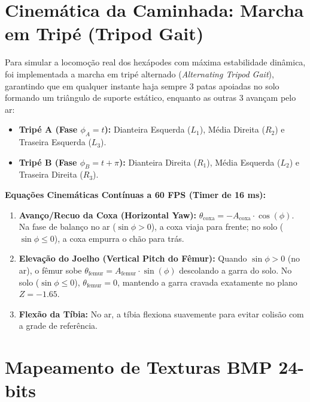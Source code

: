 \documentclass[11pt,a4paper]{article}
\begin{document}
\section{Cinemática da Caminhada: Marcha em Tripé (Tripod Gait)}

Para simular a locomoção real dos hexápodes com máxima estabilidade dinâmica, foi implementada a marcha em tripé alternado (\textit{Alternating Tripod Gait}), garantindo que em qualquer instante haja sempre 3 patas apoiadas no solo formando um triângulo de suporte estático, enquanto as outras 3 avançam pelo ar:

\begin{itemize}[leftmargin=*]
    \item \textbf{Tripé A (Fase $\phi_A = t$):} Dianteira Esquerda ($L_1$), Média Direita ($R_2$) e Traseira Esquerda ($L_3$).
    \item \textbf{Tripé B (Fase $\phi_B = t + \pi$):} Dianteira Direita ($R_1$), Média Esquerda ($L_2$) e Traseira Direita ($R_3$).
\end{itemize}

\textbf{Equações Cinemáticas Contínuas a 60 FPS (Timer de 16 ms):}
\begin{enumerate}[leftmargin=*,noitemsep]
    \item \textbf{Avanço/Recuo da Coxa (Horizontal Yaw):} $\theta_{\text{coxa}} = -A_{\text{coxa}} \cdot \cos(\phi)$. Na fase de balanço no ar ($\sin \phi > 0$), a coxa viaja para frente; no solo ($\sin \phi \le 0$), a coxa empurra o chão para trás.
    \item \textbf{Elevação do Joelho (Vertical Pitch do Fêmur):} Quando $\sin \phi > 0$ (no ar), o fêmur sobe $\theta_{\text{femur}} = A_{\text{femur}} \cdot \sin(\phi)$ descolando a garra do solo. No solo ($\sin \phi \le 0$), $\theta_{\text{femur}} = 0$, mantendo a garra cravada exatamente no plano $Z = -1.65$.
    \item \textbf{Flexão da Tíbia:} No ar, a tíbia flexiona suavemente para evitar colisão com a grade de referência.
\end{enumerate}

\section{Mapeamento de Texturas BMP 24-bits}
\end{document}
